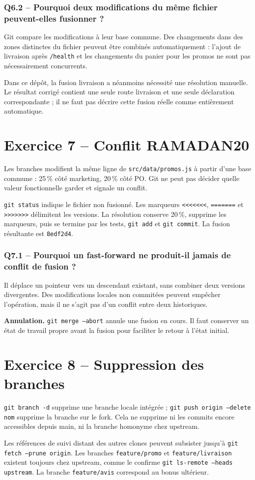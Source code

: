 \documentclass[10pt,a4paper]{article}
\newcommand{\question}[1]{\subsubsection*{#1}}
\begin{document}
\question{Q6.2 -- Pourquoi deux modifications du même fichier peuvent-elles fusionner ?}
Git compare les modifications à leur base commune. Des changements dans des zones distinctes du fichier peuvent être combinés automatiquement : l'ajout de livraison après \texttt{/health} et les changements du panier pour les promos ne sont pas nécessairement concurrents.

Dans ce dépôt, la fusion livraison a néanmoins nécessité une résolution manuelle. Le résultat corrigé contient une seule route livraison et une seule déclaration correspondante ; il ne faut pas décrire cette fusion réelle comme entièrement automatique.

\newpage
\section*{Exercice 7 -- Conflit RAMADAN20}
Les branches modifient la même ligne de \texttt{src/data/promos.js} à partir d'une base commune : 25\,\% côté marketing, 20\,\% côté PO. Git ne peut pas décider quelle valeur fonctionnelle garder et signale un conflit.

\texttt{git status} indique le fichier non fusionné. Les marqueurs \texttt{<<<<<<<}, \texttt{=======} et \texttt{>>>>>>>} délimitent les versions. La résolution conserve 20\,\%, supprime les marqueurs, puis se termine par les tests, \texttt{git add} et \texttt{git commit}. La fusion résultante est \texttt{8edf2d4}.

\question{Q7.1 -- Pourquoi un fast-forward ne produit-il jamais de conflit de fusion ?}
Il déplace un pointeur vers un descendant existant, sans combiner deux versions divergentes. Des modifications locales non commitées peuvent empêcher l'opération, mais il ne s'agit pas d'un conflit entre deux historiques.

\textbf{Annulation.} \texttt{git merge --abort} annule une fusion en cours. Il faut conserver un état de travail propre avant la fusion pour faciliter le retour à l'état initial.

\section*{Exercice 8 -- Suppression des branches}
\texttt{git branch -d} supprime une branche locale intégrée ; \texttt{git push origin --delete nom} supprime la branche sur le fork. Cela ne supprime ni les commits encore accessibles depuis main, ni la branche homonyme chez upstream.

Les références de suivi distant des autres clones peuvent subsister jusqu'à \texttt{git fetch --prune origin}. Les branches \texttt{feature/promo} et \texttt{feature/livraison} existent toujours chez upstream, comme le confirme \texttt{git ls-remote --heads upstream}. La branche \texttt{feature/avis} correspond au bonus ultérieur.
\end{document}
